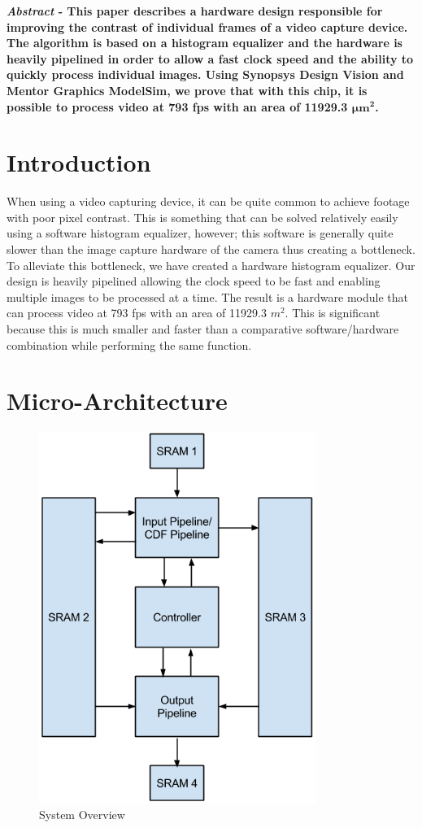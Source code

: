 \documentclass[10pt]{IEEEtran}
\begin{document}

\textbf{\emph{Abstract} - This paper describes a hardware design responsible for improving the contrast of individual frames of a video capture device. The algorithm is based on a histogram equalizer and the hardware is heavily pipelined in order to allow a fast clock speed and the ability to quickly process individual images. Using Synopsys Design Vision and Mentor Graphics ModelSim, we prove that with this chip, it is possible to process video at 793 fps with an area of 11929.3 $\mathbf{\boldsymbol\mu m^{2}}$.}
 

\section{Introduction}

When using a video capturing device, it can be quite common to achieve footage with poor pixel contrast. This is something that can be solved relatively easily using a software histogram equalizer, however; this software is generally quite slower than the image capture hardware of the camera thus creating a bottleneck. To alleviate this bottleneck, we have created a hardware histogram equalizer. Our design is heavily pipelined allowing the clock speed to be fast and enabling multiple images to be processed at a time. The result is a hardware module that can process video at 793 fps with an area of 11929.3 $m^{2}$. This is significant because this is much smaller and faster than a comparative software/hardware combination while performing the same function.
 

\section{Micro-Architecture}

\begin{figure}[htb!]
	\includegraphics[width=90mm]{System_Overview.png}
	\caption{System Overview}
\end{figure}
\end{document}
